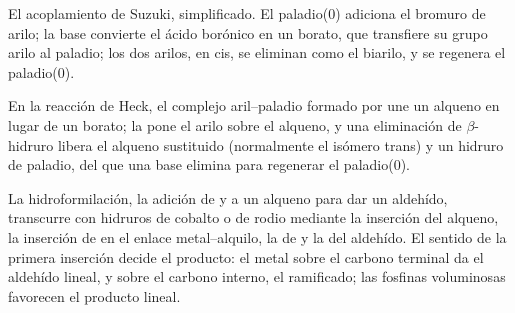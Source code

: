 \begin{omfigure}

{\small El acoplamiento de Suzuki, simplificado. El paladio(0) adiciona el bromuro de arilo; la base
convierte el ácido borónico en un borato, que transfiere su grupo arilo al paladio; los dos
arilos, en cis, se eliminan como el biarilo, y se regenera el paladio(0).}
\end{omfigure}

En la reacción de Heck, el complejo aril--paladio formado por  une un
alqueno en lugar de un borato; la  pone el arilo sobre el alqueno, y una
eliminación de $\beta$-hidruro libera el alqueno sustituido (normalmente el isómero trans)
y un hidruro de paladio, del que una base elimina  para regenerar el paladio(0).

La hidroformilación, la adición de  y  a un alqueno para dar un aldehído,
transcurre con hidruros de cobalto o de rodio mediante la inserción del alqueno, la inserción de 
en el enlace metal--alquilo, la  de  y la  del
aldehído. El sentido de la primera inserción decide el producto: el metal sobre el
carbono terminal da el aldehído lineal, y sobre el carbono interno, el ramificado; las fosfinas
voluminosas favorecen el producto lineal.

